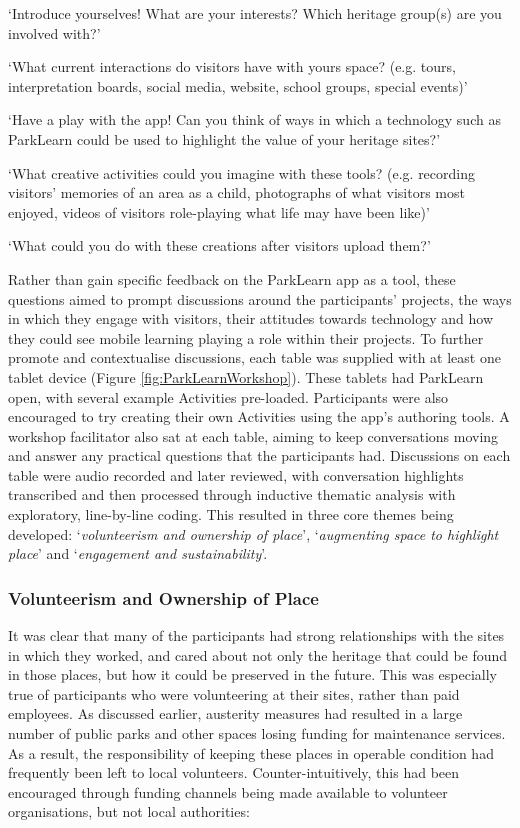 \begin{displayquote}
`Introduce yourselves! What are your interests? Which heritage group(s) are you involved with?'

`What current interactions do visitors have with yours space? (e.g. tours, interpretation boards, social media, website, school groups, special events)'

`Have a play with the app! Can you think of ways in which a technology such as ParkLearn could be used to highlight the value of your heritage sites?'

`What creative activities could you imagine with these tools? (e.g. recording visitors' memories of an area as a child, photographs of what visitors most enjoyed, videos of visitors role-playing what life may have been like)'

`What could you do with these creations after visitors upload them?'
\end{displayquote}

Rather than gain specific feedback on the ParkLearn app as a tool, these questions aimed to prompt discussions around the participants' projects, the ways in which they engage with visitors, their attitudes towards technology and how they could see mobile learning playing a role within their projects. To further promote and contextualise discussions, each table was supplied with at least one tablet device (Figure \ref{fig:ParkLearnWorkshop}). These tablets had ParkLearn open, with several example Activities pre-loaded. Participants were also encouraged to try creating their own Activities using the app's authoring tools. A workshop facilitator also sat at each table, aiming to keep conversations moving and answer any practical questions that the participants had. Discussions on each table were audio recorded and later reviewed, with conversation highlights transcribed and then processed through inductive thematic analysis with exploratory, line-by-line coding. This resulted in three core themes being developed: `\textit{volunteerism and ownership of place}', `\textit{augmenting space to highlight place}' and `\textit{engagement and sustainability}'.

\subsubsection{Volunteerism and Ownership of Place}
It was clear that many of the participants had strong relationships with the sites in which they worked, and cared about not only the heritage that could be found in those places, but how it could be preserved in the future. This was especially true of participants who were volunteering at their sites, rather than paid employees. As discussed earlier, austerity measures had resulted in a large number of public parks and other spaces losing funding for maintenance services. As a result, the responsibility of keeping these places in operable condition had frequently been left to local volunteers. Counter-intuitively, this had been encouraged through funding channels being made available to volunteer organisations, but not local authorities: 

